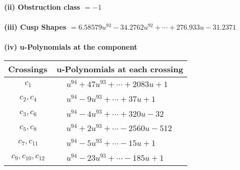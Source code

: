 \documentclass[1p]{elsarticle_modified}
\theoremstyle{definition}
\begin{document}
\flushleft \textbf{(ii) Obstruction class $= -1$}\\~\\
\flushleft \textbf{(iii) Cusp Shapes $= 6.58579 u^{93}-34.2762 u^{92}+\cdots+276.933 u-31.2371$}\\~\\
\newpage\renewcommand{\arraystretch}{1}
\flushleft \textbf{(iv) u-Polynomials at the component}\newline \\
\begin{tabular}{m{50pt}|m{274pt}}
Crossings & \hspace{64pt}u-Polynomials at each crossing \\
\hline $$\begin{aligned}c_{1}\end{aligned}$$&$\begin{aligned}
&u^{94}+47 u^{93}+\cdots+2083 u+1
\end{aligned}$\\
\hline $$\begin{aligned}c_{2},c_{4}\end{aligned}$$&$\begin{aligned}
&u^{94}-9 u^{93}+\cdots+37 u+1
\end{aligned}$\\
\hline $$\begin{aligned}c_{3},c_{6}\end{aligned}$$&$\begin{aligned}
&u^{94}-4 u^{93}+\cdots+320 u-32
\end{aligned}$\\
\hline $$\begin{aligned}c_{5},c_{8}\end{aligned}$$&$\begin{aligned}
&u^{94}+2 u^{93}+\cdots-2560 u-512
\end{aligned}$\\
\hline $$\begin{aligned}c_{7},c_{11}\end{aligned}$$&$\begin{aligned}
&u^{94}-5 u^{93}+\cdots-15 u+1
\end{aligned}$\\
\hline $$\begin{aligned}c_{9},c_{10},c_{12}\end{aligned}$$&$\begin{aligned}
&u^{94}-23 u^{93}+\cdots-185 u+1
\end{aligned}$\\
\hline
\end{tabular}\\~\\
\end{document}
